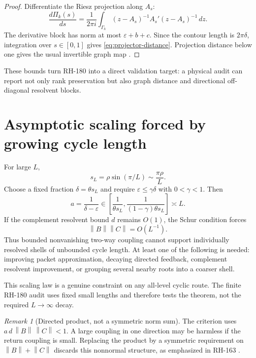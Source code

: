 \documentclass[12pt]{article}
\theoremstyle{remark}
\newtheorem{remark}[theorem]{Remark}
\newcommand{\norm}[1]{\left\lVert#1\right\rVert}
\begin{document}
\begin{proof}
Differentiate the Riesz projection along $A_s$:
\[
 \frac{d\Pi_k(s)}{ds}
 =\frac1{2\pi i}\int_{\Gamma_k}
 (z-A_s)^{-1}A_s'(z-A_s)^{-1}\,dz.
\]
The derivative block has norm at most $\varepsilon+b+c$.  Since the contour
length is $2\pi\delta$, integration over $s\in[0,1]$ gives
\eqref{eq:projector-distance}.  Projection distance below one gives the usual
invertible graph map \citep{Kato1995}.
\end{proof}

These bounds turn RH-180 into a direct validation target: a physical audit
can report not only rank preservation but also graph distance and directional
off-diagonal resolvent blocks.

\section{Asymptotic scaling forced by growing cycle length}

For large $L$,
\begin{equation}\label{eq:spacing-asymptotic}
 s_L=\rho\sin(\pi/L)\sim\frac{\pi\rho}{L}.
\end{equation}
Choose a fixed fraction $\delta=\theta s_L$ and require
$\varepsilon\le\gamma\delta$ with $0<\gamma<1$.  Then
\[
 a=\frac1{\delta-\varepsilon}
 \in\left[\frac1{\theta s_L},
 \frac1{(1-\gamma)\theta s_L}\right]
 \asymp L.
\]
If the complement resolvent bound $d$ remains $O(1)$, the Schur condition
forces
\begin{equation}\label{eq:coupling-scaling}
 \norm B\norm C=O(L^{-1}).
\end{equation}
Thus bounded nonvanishing two-way coupling cannot support individually
resolved shells of unbounded cycle length.  At least one of the following is
needed: improving packet approximation, decaying directed feedback,
complement resolvent improvement, or grouping several nearby roots into a
coarser shell.

This scaling law is a genuine constraint on any all-level cyclic route.  The
finite RH-180 audit uses fixed small lengths and therefore tests the theorem,
not the required $L\to\infty$ decay.

\begin{remark}[Directed product, not a symmetric norm sum]
The criterion uses
$a\,d\,\norm B\,\norm C<1$.  A large coupling in one direction may be
harmless if the return coupling is small.  Replacing the product by a
symmetric requirement on $\norm B+\norm C$ discards this nonnormal structure,
as emphasized in RH-163 \citep{WangRH163}.
\end{remark}
\end{document}
